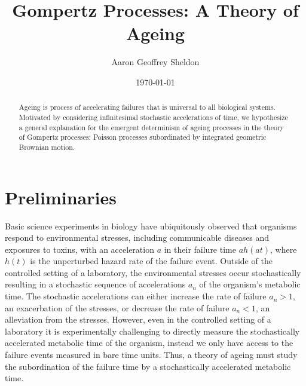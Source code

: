\documentclass{article}
\theoremstyle{definition}\newtheorem{definition}{Definition}
\begin{document}
  \title{Gompertz Processes: A Theory of Ageing}
  \author{Aaron Geoffrey Sheldon}
  \date{\today}
  \maketitle

  \begin{abstract}
    Ageing is process of accelerating failures that is universal to all biological systems.
    Motivated by considering infinitesimal stochastic accelerations of time, we hypothesize
    a general explanation for the emergent determinism of ageing processes in the theory of
    Gompertz processes: Poisson processes subordinated by integrated geometric Brownian
    motion.
  \end{abstract}

  \section{Preliminaries}
  Basic science experiments in biology have ubiquitously observed that organisms respond to
  environmental stresses, including communicable diseases and exposures to toxins, with an
  acceleration $a$ in their failure time $a h\left(a t\right)$, where $h\left(t\right)$ is
  the unperturbed hazard rate of the failure event. Outside of the controlled setting of a
  laboratory, the environmental stresses occur stochastically resulting in a stochastic
  sequence of accelerations $a_n$ of the organism's metabolic time. The stochastic
  accelerations can either increase the rate of failure $a_n > 1$, an exacerbation of the
  stresses, or decrease the rate of failure $a_n < 1$, an alleviation from the stresses.
  However, even in the controlled setting of a laboratory it is experimentally challenging
  to directly measure the stochastically accelerated metabolic time of the organism, instead
  we only have access to the failure events measured in bare time units. Thus, a theory of
  ageing must study the subordination of the failure time by a stochastically accelerated
  metabolic time.
\end{document}
